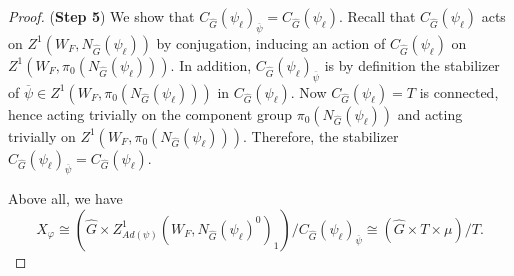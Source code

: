 \begin{theorem}
\begin{proof}
    	(\textbf{Step 5}) We show that $C_{\hat{G}}(\psi_{\ell})_{\overline{\psi}}=C_{\hat{G}}(\psi_{\ell})$. Recall that $C_{\hat{G}}(\psi_{\ell})$ acts on $Z^1(W_F, N_{\hat{G}}(\psi_{\ell}))$ by conjugation, inducing an action of $C_{\hat{G}}(\psi_{\ell})$ on $Z^1(W_F, \pi_0(N_{\hat{G}}(\psi_{\ell}))).$ In addition, $C_{\hat{G}}(\psi_{\ell})_{\overline{\psi}}$ is by definition the stabilizer of $\overline{\psi} \in Z^1(W_F, \pi_0(N_{\hat{G}}(\psi_{\ell})))$ in $C_{\hat{G}}(\psi_{\ell})$. Now $C_{\hat{G}}(\psi_{\ell})=T$ is connected, hence acting trivially on the component group $\pi_0(N_{\hat{G}}(\psi_{\ell}))$ and acting trivially on $Z^1(W_F, \pi_0(N_{\hat{G}}(\psi_{\ell})))$. Therefore, the stabilizer $C_{\hat{G}}(\psi_{\ell})_{\overline{\psi}}=C_{\hat{G}}(\psi_{\ell})$.
    	
    	Above all, we have 
        \begin{equation}
    		X_{\varphi} \cong (\hat{G} \times Z^1_{Ad(\psi)}(W_F, N_{\hat{G}}(\psi_{\ell})^0)_1)/C_{\hat{G}}(\psi_{\ell})_{\overline{\psi}} \cong (\hat{G} \times T \times \mu)/T.
        \end{equation}
    \end{proof}
\end{theorem}

